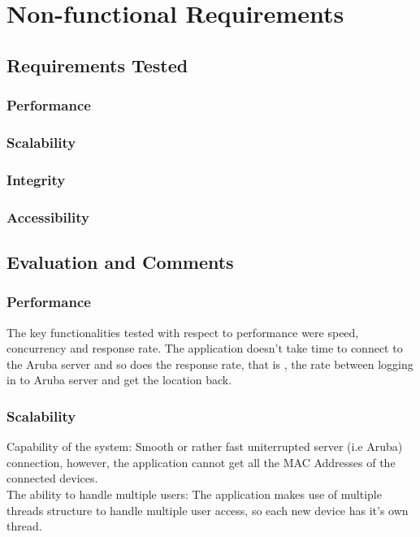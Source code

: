 
	\section{Non-functional Requirements}
		\subsection{Requirements Tested}

			\subsubsection{Performance}
			\subsubsection{Scalability}
			\subsubsection{Integrity}
			\subsubsection{Accessibility}
			
	
			\subsection{Evaluation and Comments}

			
			\subsubsection{Performance}
			The key functionalities tested with respect to performance were speed, concurrency and response rate. The application doesn't take time to connect to
			the Aruba server and so does the response rate, that is , the rate between logging in to Aruba server and get the location back.
			
			\subsubsection{Scalability}
			Capability of the system: Smooth or rather fast uniterrupted  server (i.e Aruba) connection, however, the application cannot get all the MAC Addresses of
			the connected devices. \\
			The ability to handle multiple users: The application makes use of multiple threads structure to handle multiple user access, so each new device has it's own thread.


